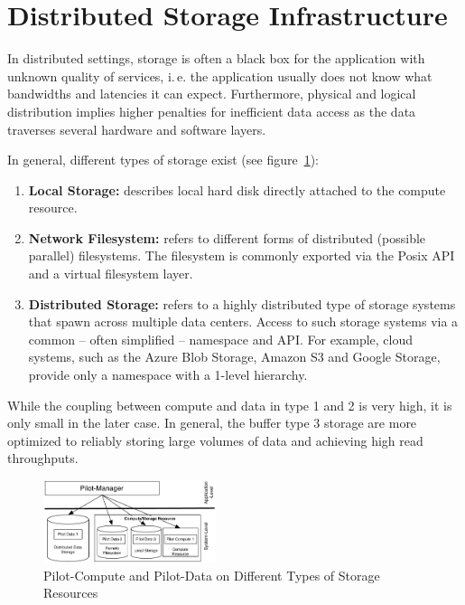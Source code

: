\documentclass[conference]{IEEEtran}
\begin{document}
\section{Distributed Storage Infrastructure}

In distributed settings, storage is often a black box for the application with
unknown quality of services, i.\,e. the application usually does not know what
bandwidths and latencies it can expect. Furthermore, physical and logical
distribution implies higher penalties for inefficient data access as the data
traverses several hardware and software layers.


In general, different types of storage exist (see 
figure~\ref{fig:figures_storage-types}):

\begin{enumerate}
	\item \textbf{Local Storage:} describes local hard disk directly attached 
	to the compute resource.
	\item \textbf{Network Filesystem:} refers to different forms of 
	distributed (possible parallel) filesystems. The filesystem is commonly 
	exported via the Posix API and a virtual filesystem layer.
	\item \textbf{Distributed Storage:} refers to a highly distributed type of 
	storage systems that spawn across multiple data centers. Access to such 
	storage systems via a common -- often simplified -- namespace and API. For 
	example, cloud systems, such as the Azure Blob Storage, Amazon S3 and 
	Google Storage, provide only a namespace with a 1-level hierarchy. 
\end{enumerate}

While the coupling between compute and data in type 1 and 2 is very high, it 
is only small in the later case. In general, the buffer type 3 storage are 
more optimized to reliably storing large volumes of data and achieving high
read throughputs.


\begin{figure}[t]
	\centering
		\includegraphics[width=0.45\textwidth]{figures/storage-types.pdf}
	\caption{Pilot-Compute and Pilot-Data on Different Types of Storage Resources}
	\label{fig:figures_storage-types}
\end{figure}
\end{document}
